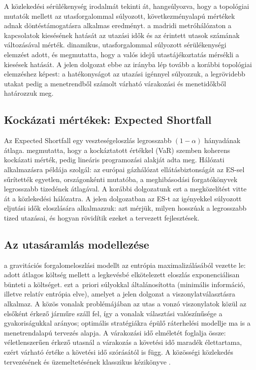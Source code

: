 \documentclass[12pt,a4paper]{article}
\theoremstyle{definition}
\theoremstyle{remark}
\begin{document}
A közlekedési sérülékenység irodalmát \citet{mattsson2015} tekinti át,
hangsúlyozva, hogy a topológiai mutatók mellett az utasforgalommal súlyozott,
következményalapú mértékek adnak döntéstámogatásra alkalmas eredményt.
\citet{rodriguez2014} a madridi metróhálózaton a kapcsolatok kiesésének
hatását az utazási idők és az érintett utasok számának változásával mérték.
\citet{cats2014} dinamikus, utasforgalommal súlyozott sérülékenységi
elemzést adott, és megmutatta, hogy a valós idejű utastájékoztatás mérsékli
a kiesések hatását. A jelen dolgozat ebbe az irányba lép tovább a korábbi
topológiai elemzéshez képest: a hatékonyságot az utazási igénnyel súlyozzuk,
a legrövidebb utakat pedig a menetrendből számolt várható várakozási és
menetidőkből határozzuk meg.

\subsection{Kockázati mértékek: Expected Shortfall}

Az Expected Shortfall egy veszteségeloszlás legrosszabb $(1-\alpha)$ hányadának
átlaga. \citet{acerbi2002} megmutatta, hogy a kockáztatott értékkel (VaR)
szemben koherens kockázati mérték, \citet{rockafellar2000} pedig lineáris
programozási alakját adta meg. Hálózati alkalmazásra \citet{koczy2022}
példája szolgál: az európai gázhálózat ellátásbiztonságát az ES-sel sűrítették
egyetlen, országonkénti mutatóba, a meghibásodási forgatókönyvek legrosszabb
tizedének átlagával. A korábbi dolgozatunk ezt a megközelítést vitte át a
közlekedési hálózatra. A jelen dolgozatban az ES-t az igényekkel súlyozott
eljutási idők eloszlására alkalmazzuk: azt mérjük, milyen hosszúak a
legrosszabb tized utazásai, és hogyan rövidítik ezeket a tervezett fejlesztések.

\subsection{Az utasáramlás modellezése}

\citet{wilson1969} a gravitációs forgalomeloszlási modellt az entrópia
maximalizálásából vezette le: adott átlagos költség mellett a legkevésbé
elkötelezett eloszlás exponenciálisan bünteti a költséget.
\citet{snickars1977} ezt a~priori súlyokkal általánosította (minimális
információ, illetve relatív entrópia elve), amelyet a jelen dolgozat a
viszonylatválasztásra alkalmaz. A közös vonalak problémájában
\citep{chriqui1975} az utas a vonzó viszonylatok közül az elsőként érkező
járműre száll fel, így a vonalak választási valószínűsége a gyakoriságukkal
arányos; \citet{spiess1989} optimális stratégiákra épülő ráterhelési modellje
ma is a menetrendalapú tervezés alapja. A várakozási idő elméletét
\citet{larson1981} foglalja össze: véletlenszerűen érkező utasnál a várakozás a
követési idő maradék élettartama, ezért várható értéke a követési idő
szórásától is függ. A közösségi közlekedés tervezésének és üzemeltetésének
klasszikus kézikönyve \citet{vuchic2005}.
\end{document}
